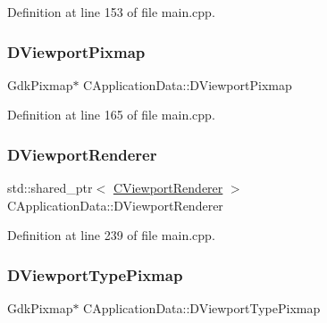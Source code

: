 Definition at line 153 of file main.\+cpp.

\hypertarget{classCApplicationData_ac8801e116d0c49776c9f3db7415287fe}{}\label{classCApplicationData_ac8801e116d0c49776c9f3db7415287fe} 
\subsubsection{\texorpdfstring{D\+Viewport\+Pixmap}{DViewportPixmap}}
{\footnotesize\ttfamily Gdk\+Pixmap$\ast$ C\+Application\+Data\+::\+D\+Viewport\+Pixmap\hspace{0.3cm}{\ttfamily [protected]}}



Definition at line 165 of file main.\+cpp.

\hypertarget{classCApplicationData_a31da050ebca942272344c8b736d72848}{}\label{classCApplicationData_a31da050ebca942272344c8b736d72848} 
\subsubsection{\texorpdfstring{D\+Viewport\+Renderer}{DViewportRenderer}}
{\footnotesize\ttfamily std\+::shared\+\_\+ptr$<$ \hyperlink{classCViewportRenderer}{C\+Viewport\+Renderer} $>$ C\+Application\+Data\+::\+D\+Viewport\+Renderer\hspace{0.3cm}{\ttfamily [protected]}}



Definition at line 239 of file main.\+cpp.

\hypertarget{classCApplicationData_a3a71a311e7bf0d4a002412343f69e794}{}\label{classCApplicationData_a3a71a311e7bf0d4a002412343f69e794} 
\subsubsection{\texorpdfstring{D\+Viewport\+Type\+Pixmap}{DViewportTypePixmap}}
{\footnotesize\ttfamily Gdk\+Pixmap$\ast$ C\+Application\+Data\+::\+D\+Viewport\+Type\+Pixmap\hspace{0.3cm}{\ttfamily [protected]}}



